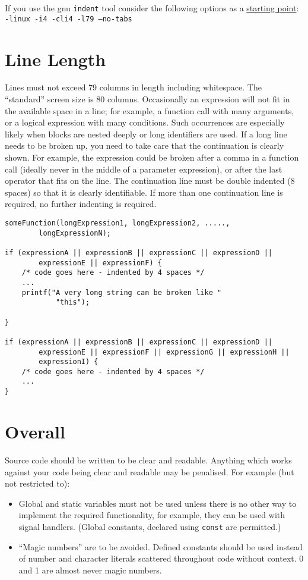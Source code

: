 \documentclass{article}
\begin{document}
If you use the gnu \texttt{indent} tool consider the following options as a \underline{starting point}:\\
\texttt{-linux -i4 -cli4 -l79 --no-tabs}

\section{Line Length}
Lines must not exceed 79 columns in length including whitespace.
The ``standard'' screen size is 80 columns.
Occasionally an expression will not fit in the available space in a line; for example, a function call with many arguments, or a logical expression with many conditions.
Such occurrences are especially likely when blocks are nested deeply or long identifiers are used.
If a long line needs to be broken up, you need to take care that the continuation is clearly shown.
For example, the expression could be broken after a comma in a function call (ideally never in the middle of a parameter expression), or after the last operator that fits on the line.
The continuation line must be double indented (8 spaces) so that it is clearly identifiable.
If more than one continuation line is required, no further indenting is required.

\begin{lstlisting}
someFunction(longExpression1, longExpression2, .....,
        longExpressionN);

if (expressionA || expressionB || expressionC || expressionD ||
        expressionE || expressionF) {
    /* code goes here - indented by 4 spaces */
    ...
    printf("A very long string can be broken like "
            "this");

}

if (expressionA || expressionB || expressionC || expressionD ||
        expressionE || expressionF || expressionG || expressionH ||
        expressionI) {
    /* code goes here - indented by 4 spaces */
    ...
}
\end{lstlisting}

\section{Overall}
\label{sec:overall}
Source code should be written to be clear and readable.
Anything which works against your code being clear and readable may be penalised.
For example (but not restricted to):
\begin{itemize}
\item Global and static variables must not be used unless there is no other way to implement the required functionality, for example, 
they can be used with signal handlers. (Global constants, declared using \texttt{const} are permitted.)
\item ``Magic numbers'' are to be avoided. Defined constants should be used instead of number and character literals scattered throughout code without context. 0 and 1 are almost never magic numbers.
\end{itemize}
\end{document}
